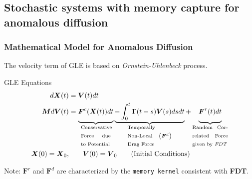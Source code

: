 \documentclass[a4paper,10pt]{beamer}
\newcommand{\BS}[1]{\boldsymbol{#1}}
\newcommand{\rb}[1]{\left( #1 \right)}
\begin{document}
	\begin{frame}
		\small
		\subsection{Stochastic systems with memory capture for anomalous diffusion}
		\frametitle{Mathematical Model for Anomalous Diffusion}
		
		The velocity term of GLE is based on \textit{Ornstein-Uhlenbeck} process.
	
		\begin{block}{GLE Equations}
			\begin{align}
			d\BS{X}(t) &= \BS{V}(t) dt \\
			\BS{M} d\BS{V}(t) &= \underbrace{\vphantom{- \int_{0}^{t} \BS{\Gamma}(t-s) \BS{V}(s) ds dt}\BS{F}^{c}(\BS{X}(t)) dt}_{\text{\centering \begin{minipage}{1.5cm}
					Conservative Force due to Potential
			\end{minipage}}}
			\underbrace{- \int_{0}^{t} \BS{\Gamma}(t-s) \BS{V}(s) ds dt}_{\text{\centering \begin{minipage}{1.5cm}
				Temporally Non-Local Drag Force
				\end{minipage}}\;\rb{\BS{F}^{d}}} + \underbrace{\vphantom{- \int_{0}^{t} \BS{\Gamma}(t-s) \BS{V}(s) ds dt}\BS{F}^{r}(t)dt}_{\text{\begin{minipage}{1.8cm}
				Random Correlated Force given by \textit{FDT}
				\end{minipage}}} \\
			\BS{X}(0) = \BS{X}_{0}, &\qquad \BS{V}(0) = \BS{V}_{0} \qquad (\text{Initial Conditions})
			\end{align}
		\end{block}
		\begin{alertblock}{Note:}
			$\BS{F}^{r}$ and $\BS{F}^{d}$ are characterized by the \texttt{memory kernel} consistent with \textbf{FDT}.
		\end{alertblock}
	\end{frame}
\end{document}
